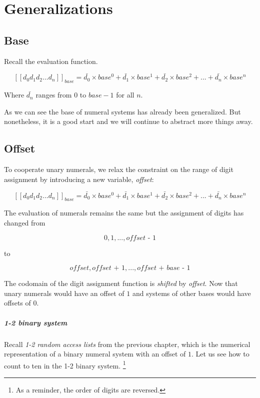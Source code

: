 \documentclass[\main/thesis.tex]{subfiles}
\begin{document}
\chapter{Generalizations}\label{generalizations}


\section{Base}

Recall the evaluation function.

$$
    [\![d_0d_1d_2...d_n]\!]_{base}
    =
    \bar{d_0}\times base^0 + \bar{d_1}\times base^1 + \bar{d_2}\times base^2 + ... + \bar{d_n}\times base^n
$$

Where $ \bar{d_n} $ ranges from $ 0 $ to $ base - 1 $ for all $ n $.

As we can see the base of numeral systems has already been generalized.
But nonetheless, it is a good start and we will continue to abstract more things
away.

\section{Offset}

To cooperate unary numerals, we relax the constraint on the range of digit
assignment by introducing a new variable, \textit{offset}:

$$
    [\![d_0d_1d_2...d_n]\!]_{base}
    =
    \bar{d_0}\times base^0 + \bar{d_1}\times base^1 + \bar{d_2}\times base^2 + ... + \bar{d_n}\times base^n
$$

The evaluation of numerals remains the same but the assignment of digits has changed from

$$
    { 0, 1, ..., \textit{offset - 1} }
$$

to

$$
    { \textit{offset}, \textit{offset + 1}, ..., \textit{offset + base - 1} }
$$

The codomain of the digit assignment function is \textit{shifted} by \textit{offset}.
Now that unary numerals would have an offset of $ 1 $
and systems of other bases would have offsets of $ 0 $.

\paragraph{1-2 binary system}
Recall \textit{1-2 random access lists} from the previous chapter,
which is the numerical representation of a binary numeral system with an offset
of $ 1 $.
Let us see how to count to ten in the 1-2 binary system.
\footnote{As a reminder, the order of digits are reversed.}
\end{document}
